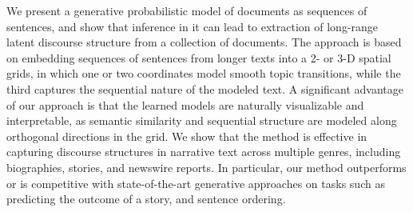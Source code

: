 We present a generative probabilistic model of documents as sequences of sentences, and show that inference in it can lead to extraction of long-range latent discourse structure from a collection of documents. The approach is based on embedding sequences of sentences from longer texts into a 2- or 3-D spatial grids, in which one or two coordinates model smooth topic transitions, while the third captures the sequential nature of the modeled text. A significant advantage of our approach is that the learned models are naturally visualizable and interpretable, as semantic similarity and sequential structure are modeled along orthogonal directions in the grid. We show that the method is effective in capturing discourse structures in narrative    text across multiple genres, including biographies, stories, and newswire reports. In particular, our method outperforms or is competitive with state-of-the-art generative approaches on tasks such as predicting the outcome of a story, and sentence ordering.
